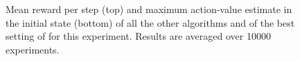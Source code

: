 \documentclass[conference]{IEEEtran}
\begin{document}
\begin{figure}[t]
\begin{minipage}{\columnwidth}
\centering
  \hspace{-.5cm}
\end{minipage}
  \caption{Mean reward per step (top) and maximum action-value estimate in the initial state (bottom) of all the other algorithms and of the best setting of \alg for this experiment. Results are averaged over 10000 experiments.}
  \label{F:hasselt_all}
\end{figure}
\end{document}
